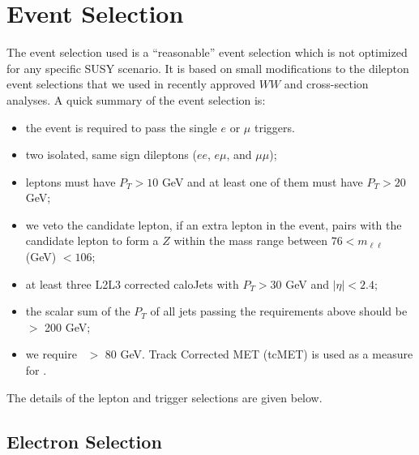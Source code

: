 \section{Event Selection}
\label{sec:eventselection}

The event selection used is a ``reasonable'' event
selection which is not optimized for any specific SUSY scenario.
It is based on small modifications to the dilepton event selections 
that we used in recently approved 
$WW$\cite{ww} and \ttbar\cite{ttbar} cross-section
analyses.  A quick summary of the event selection is:
\begin{itemize}
\item the event is required to pass the single $e$ or $\mu$  triggers.
\item two isolated, same sign dileptons ($ee$, $e\mu$, and $\mu\mu$);  
\item leptons must have $P_T > 10$ GeV and at least one of them must have $P_T > 20$ GeV;
\item we veto the candidate lepton, if an extra lepton in the event, pairs with the candidate lepton
to form a $Z$ within the mass range between $76 < m_{\ell\ell} $ (GeV) $< 106$; 
\item at least three L2L3 corrected caloJets with $P_T > 30$ GeV and $|\eta|< 2.4$;
\item the scalar sum of the $P_T$ of all jets passing the requirements above should be $>$ 200 GeV;
\item we require \met~$>$ 80 GeV. Track Corrected MET (tcMET) \cite{tcmet} is used as a measure for \met.
\end{itemize}
\noindent The details of the lepton and trigger selections are given below.

\subsection{Electron Selection}
\label{sec:electron}


